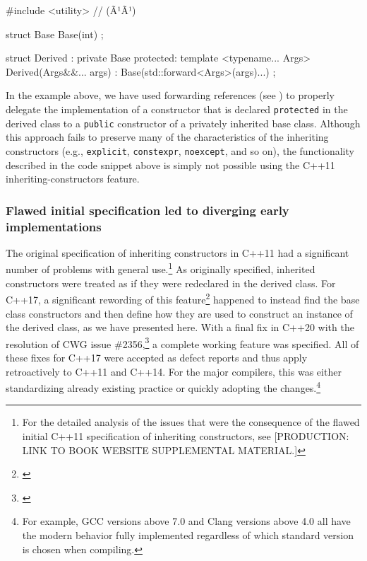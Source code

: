 \begin{emcppslisting}[language=C++]
#include <utility>  // (Ã¹{}Ã¹)

struct Base
{
    Base(int) { }
};

struct Derived : private Base
{
protected:
    template <typename... Args>
    Derived(Args&&... args) : Base(std::forward<Args>(args)...)
    {
    }
};
\end{emcppslisting}
    
\noindent In the example above, we have used forwarding references (see ) 
to properly delegate the implementation of a constructor that is
declared \mbox{\lstinline!protected!} in the derived class to a \lstinline!public!
constructor of a privately inherited base class. Although this approach
fails to preserve many of the characteristics of the inheriting
constructors (e.g., \lstinline!explicit!, \lstinline!constexpr!,
\lstinline!noexcept!, and so on), the functionality described in the code snippet above is
simply not possible using the C++11 inheriting-constructors feature.

\subsubsection[Flawed initial specification led to diverging early implementations]{Flawed initial specification led to diverging early implementations}

The original specification of inheriting constructors in C++11 had a
significant number of problems with general use.\footnote{For the detailed analysis of the issues that were the consequence of the flawed initial C++11 specification of inheriting constructors, see [PRODUCTION: LINK TO BOOK WEBSITE SUPPLEMENTAL MATERIAL.]} As originally specified,
inherited constructors were treated as if they were redeclared in
the derived class. For C++17, a significant rewording of this feature\footnote{\cite{smith15b}}
happened to instead find the base class
constructors and then define how they are used to construct an instance
of the derived class, as we have presented here. With a final fix in
C++20 with the resolution of CWG issue \#2356,\footnote{\cite{smith18}} a complete
working feature was specified. All of these fixes for C++17 were
accepted as defect reports and thus apply retroactively to C++11 and
C++14. For the major compilers, this was either standardizing already
existing practice or quickly adopting the changes.{\cprotect\footnote{For example, GCC versions above 7.0
and Clang versions above 4.0 all have the modern behavior
fully implemented regardless of which standard version is chosen when
  compiling.}}

